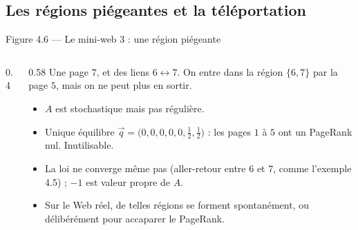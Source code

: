 \subsection{Les régions piégeantes et la téléportation}

\begin{frame}{Figure 4.6 --- Le mini-web 3 : une région piégeante}
  \begin{columns}[c]
    \begin{column}{0.4\textwidth}
    \end{column}
    \begin{column}{0.58\textwidth}
      \small Une page $7$, et des liens $6\leftrightarrow7$. On entre dans
      la région $\{6,7\}$ par la page $5$, mais on ne peut plus en sortir.
      \begin{itemize}
        \item $A$ est stochastique mais pas régulière.
        \item Unique équilibre
          $\vec q=\big(0,0,0,0,0,\tfrac12,\tfrac12\big)$ : les pages $1$ à
          $5$ ont un PageRank nul. Inutilisable.
        \item La loi ne converge même pas (aller-retour entre $6$ et $7$,
          comme l'exemple 4.5) ; $-1$ est valeur propre de $A$.
        \item Sur le Web réel, de telles régions se forment spontanément,
          ou délibérément pour accaparer le PageRank.
      \end{itemize}
    \end{column}
  \end{columns}
\end{frame}

